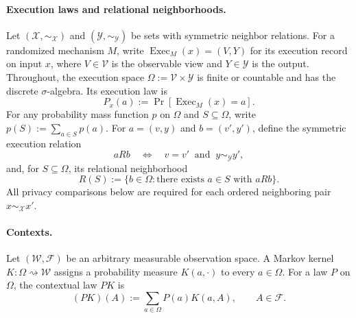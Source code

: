 \documentclass[11pt]{article}
\begin{document}
\paragraph{Execution laws and relational neighborhoods.}
Let $(\mathcal X,\sim_{\mathcal X})$ and
$(\mathcal Y,\sim_{\mathcal Y})$ be sets with symmetric neighbor relations.
For a randomized mechanism $M$, write
$\operatorname{Exec}_M(x)=(V,Y)$ for its execution record on input $x$, where
$V\in\mathcal V$ is the observable view and $Y\in\mathcal Y$ is the output.
Throughout, the execution space
$\Omega:=\mathcal V\times\mathcal Y$ is finite or countable and has the
discrete $\sigma$-algebra.  Its execution law is
\[
 P_x(a):=\Pr[\operatorname{Exec}_M(x)=a].
\]
For any probability mass function $p$ on $\Omega$ and $S\subseteq\Omega$,
write $p(S):=\sum_{a\in S}p(a)$.
For $a=(v,y)$ and $b=(v',y')$, define the symmetric execution relation
\begin{equation}
 aRb
 \quad\Longleftrightarrow\quad
 v=v'\ \text{ and }\ y\sim_{\mathcal Y}y',
 \label{eq:execution-relation}
\end{equation}
and, for $S\subseteq\Omega$, its relational neighborhood
\begin{equation}
 R(S):=\{b\in\Omega:\text{there exists }a\in S\text{ with }aRb\}.
 \label{eq:relational-neighborhood}
\end{equation}
All privacy comparisons below are required for each ordered neighboring pair
$x\sim_{\mathcal X}x'$.

\paragraph{Contexts.}
Let $(\mathcal W,\mathcal F)$ be an arbitrary measurable observation space.  A
Markov kernel $K:\Omega\rightsquigarrow\mathcal W$ assigns a probability
measure $K(a,\cdot)$ to every $a\in\Omega$.  For a law $P$ on $\Omega$, the
contextual law $PK$ is
\begin{equation}
 (PK)(A):=\sum_{a\in\Omega}P(a)K(a,A),
 \qquad A\in\mathcal F.
 \label{eq:contextual-law}
\end{equation}
\end{document}
